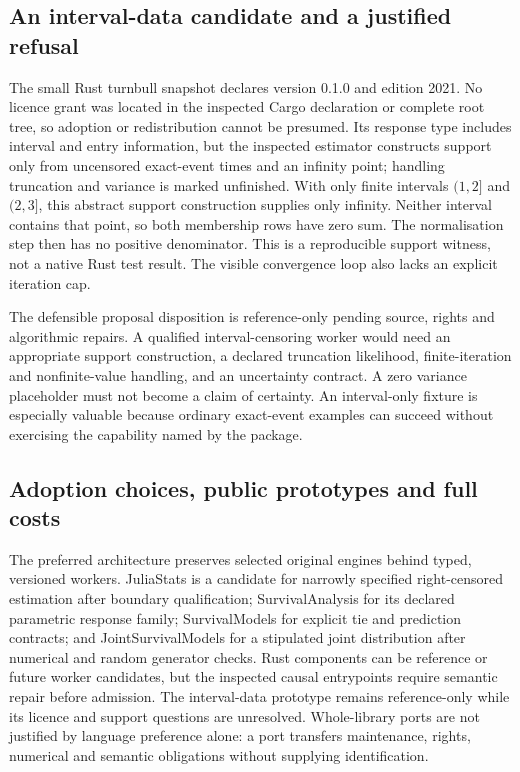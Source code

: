 \subsection{An interval-data candidate and a justified refusal}
The small Rust turnbull snapshot declares version 0.1.0 and edition 2021. No licence
grant was located in the inspected Cargo declaration or complete root tree, so
adoption or redistribution cannot be presumed. Its response type includes interval
and entry information, but the inspected estimator constructs support only from
uncensored exact-event times and an infinity point; handling truncation and variance
is marked unfinished. With only finite intervals $(1,2]$ and $(2,3]$, this abstract
support construction supplies only infinity. Neither interval contains that point,
so both membership rows have zero sum. The normalisation step then has no positive
denominator. This is a reproducible support witness, not a native Rust test result.
The visible convergence loop also lacks an explicit iteration cap.
\citep{exec24_survivalother_rustturnbull,exec24_survivalother_reference}

The defensible proposal disposition is reference-only pending source, rights and
algorithmic repairs. A qualified interval-censoring worker would need an appropriate
support construction, a declared truncation likelihood, finite-iteration and
nonfinite-value handling, and an uncertainty contract. A zero variance placeholder
must not become a claim of certainty. An interval-only fixture is especially valuable
because ordinary exact-event examples can succeed without exercising the capability
named by the package.

\subsection{Adoption choices, public prototypes and full costs}
The preferred architecture preserves selected original engines behind typed,
versioned workers. JuliaStats is a candidate for narrowly specified right-censored
estimation after boundary qualification; SurvivalAnalysis for its declared parametric
response family; SurvivalModels for explicit tie and prediction contracts; and
JointSurvivalModels for a stipulated joint distribution after numerical and random
generator checks. Rust components can be reference or future worker candidates,
but the inspected causal entrypoints require semantic repair before admission.
The interval-data prototype remains reference-only while its licence and support
questions are unresolved. Whole-library ports are not justified by language
preference alone: a port transfers maintenance, rights, numerical and semantic
obligations without supplying identification.

